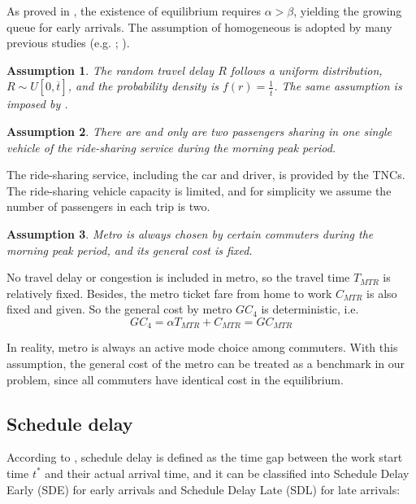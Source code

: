 \documentclass[a4paper,11pt]{article}
\newtheorem{assumption}{Assumption}
\begin{document}
As proved in \cite{lindsey2004existence}, the existence of equilibrium requires $\alpha>\beta$, yielding the growing queue for early arrivals. The assumption of homogeneous is adopted by many previous studies (e.g. \cite{wang2016equilibrium}; \cite{liu2017pricing}).

\begin{assumption} \label{ass:uniform distribution}
The random travel delay $R$ follows a uniform distribution, $R\sim U[0,\overline{t}]$, and the probability density is $f(r)=\frac{1}{\overline{t}}$. The same assumption is imposed by \cite{siu2009equilibrium}.
\end{assumption}


\begin{assumption} \label{ass:two in ride-sharing}
There are and only are two passengers sharing in one single vehicle of the ride-sharing service during the morning peak period.
\end{assumption}

The ride-sharing service, including the car and driver, is provided by the TNCs. The ride-sharing vehicle capacity is limited, and for simplicity we assume the number of passengers in each trip is two.

\begin{assumption} \label{ass:positive MTR}
Metro is always chosen by certain commuters during the morning peak period, and its general cost is fixed.
\end{assumption}

No travel delay or congestion is included in metro, so the travel time $T_{MTR}$ is relatively fixed. Besides, the metro ticket fare from home to work $C_{MTR}$ is also fixed and given. So the general cost by metro $GC_4$ is deterministic, i.e.
\begin{equation*}
    GC_4=\alpha T_{MTR} + C_{MTR} = GC_{MTR}
\end{equation*}

In reality, metro is always an active mode choice among commuters. With this assumption, the general cost of the metro can be treated as a benchmark in our problem, since all commuters have identical cost in the equilibrium.

\subsection{Schedule delay} \label{subsec:Schedule delay}

 According to \cite{small1982scheduling}, schedule delay is defined as the time gap between the work start time $t^*$ and their actual arrival time, and it can be classified into Schedule Delay Early (SDE) for early arrivals and Schedule Delay Late (SDL) for late arrivals:
\end{document}
